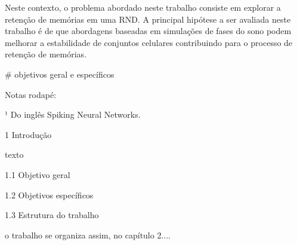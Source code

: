 Neste contexto, o problema abordado neste trabalho consiste em explorar a retenção de memórias em uma RND. A principal hipótese a
ser avaliada neste trabalho é de que abordagens baseadas em simulações de fases do sono podem melhorar a estabilidade de conjuntos
celulares contribuindo para o processo de retenção de memórias.

# objetivos geral e específicos

Notas rodapé:

¹ Do inglês Spiking Neural Networks.


1 Introdução

texto

1.1 Objetivo geral

1.2 Objetivos específicos

1.3 Estrutura do trabalho

o trabalho se organiza assim, no capítulo 2....
